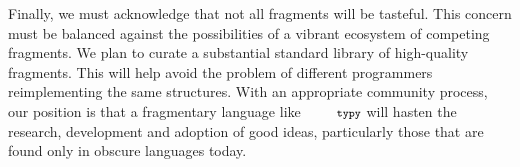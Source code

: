 \documentclass[10pt]{sigplanconf}
\newcommand{\typy}{\texttt{\footnotesize typy}}
\newcommand{\lip}[1]{\lstinline[language=Python,basicstyle=\ttfamily\footnotesize,morekeywords={with},deletendkeywords={tuple,buffer,map}]{#1}}
\newcommand{\li}[1]{\lip{#1}}
\begin{document}

Finally, we must acknowledge that not all fragments will be tasteful. This concern must be balanced against the possibilities of a vibrant ecosystem of competing fragments. %
We plan to curate a substantial standard library of high-quality fragments. This will help avoid the problem of different programmers reimplementing the same structures. With an appropriate community process, our position is that a fragmentary language like $\typy$ will hasten the research, development and adoption of good ideas, particularly those that are found only in obscure languages today.


\end{document}
